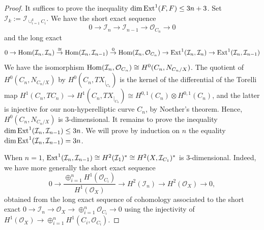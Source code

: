 \documentclass[12pt]{amsart}
\numberwithin{equation}{subsection}
\theoremstyle{plain}
\theoremstyle{definition}
\newcommand{\I}{{\mathcal I}}
\newcommand{\IsomRightArrow}{\stackrel{\cong}{\rightarrow}}
\newcommand{\RightArrowOf}[1]{\stackrel{#1}{\rightarrow}}
\newcommand{\StructureSheaf}[1]{{\mathcal O}_{#1}}
\newcommand{\restricted}[2]{#1_{\mid_{#2}}}
\newcommand{\Ext}{{\rm Ext}}
\newcommand{\Hom}{{\rm Hom}}
\newcommand{\Ideal}[1]{{\mathcal I}_{#1}}
\begin{document}
\begin{proof}
It suffices to prove the inequality $\dim \Ext^1(F,F)\leq 3n+3$.
Set $\I_k:=\Ideal{\cup_{i=1}^kC_i}$. We have the short exact sequence
\begin{equation}
\label{eq-short-exact-sequence-of-F-n}
0\rightarrow \I_n\rightarrow \I_{n-1}\rightarrow \StructureSheaf{C_n}\rightarrow 0
\end{equation}
and the long exact
\[
0\rightarrow \Hom(\I_n,\I_n) \IsomRightArrow \Hom(\I_n,\I_{n-1})\RightArrowOf{0} \Hom(\I_n,\StructureSheaf{C_n})\rightarrow 
\Ext^1(\I_n,\I_n)\rightarrow \Ext^1(\I_n,\I_{n-1})
\]
We have the isomorphism $\Hom(\I_n,\StructureSheaf{C_n})\cong H^0(C_n,N_{C_n/X})$. 
The quotient of $H^0(C_n,N_{C_n/X})$ by $H^0(C_n,\restricted{TX}{C_n})$ is the kernel of the differential  of  the Torelli map 
$H^1(C_n,TC_n)\rightarrow  H^1(C_n,\restricted{TX}{C_n})\cong H^{0,1}(C_n)\otimes H^{0,1}(C_n)$, and the latter is injective for our non-hyperelliptic curve $C_n$, by  Noether's theorem. Hence, $H^0(C_n,N_{C_n/X})$ is  $3$-dimensional. It remains to prove the inequality
$\dim \Ext^1(\I_n,\I_{n-1})\leq 3n$. We will prove by induction on $n$ the equality
$\dim \Ext^1(\I_n,\I_{n-1})= 3n$.

When $n=1$, $\Ext^1(\I_n,\I_{n-1})\cong H^2(\I_1)^*\cong H^2(X,\Ideal{C_1})^*$ is $3$-dimensional. Indeed, we have more generally the short exact sequence
\[
0\rightarrow \frac{\oplus_{i=1}^n H^1(\StructureSheaf{C_i})}{H^1(\StructureSheaf{X})}
\rightarrow H^2(\I_n)\rightarrow H^2(\StructureSheaf{X})\rightarrow 0,
\]
obtained from the long exact sequence of cohomology associated to the short exact $0\rightarrow \I_n\rightarrow \StructureSheaf{X}\rightarrow \oplus_{i=1}^n\StructureSheaf{C_i}\rightarrow 0$
using the injectivity of $H^1(\StructureSheaf{X})\rightarrow \oplus_{i=1}^nH^1(C_i,\StructureSheaf{C_i})$.


\end{proof}
\end{document}
